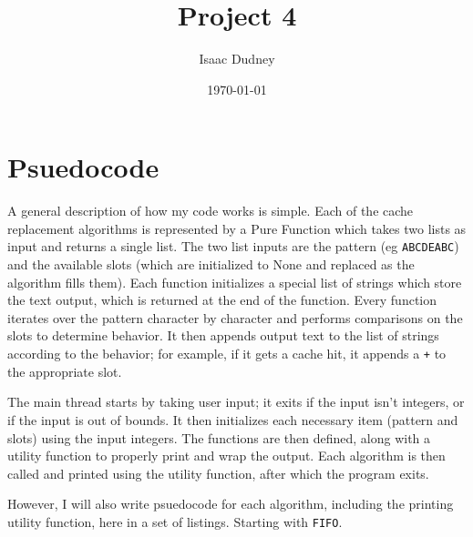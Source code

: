 \documentclass[11pt]{article}
\title{Project 4}
\author{Isaac Dudney}
\date{\today}
\begin{document}
\maketitle

\section{Psuedocode}

A general description of how my code works is simple.
Each of the cache replacement algorithms is represented by a Pure Function which takes two lists as input and returns a single list.
The two list inputs are the pattern (eg \texttt{ABCDEABC}) and the available slots (which are initialized to None and replaced as the algorithm fills them).
Each function initializes a special list of strings which store the text output, which is returned at the end of the function.
Every function iterates over the pattern character by character and performs comparisons on the slots to determine behavior.
It then appends output text to the list of strings according to the behavior; for example, if it gets a cache hit, it appends a \texttt{+} to the appropriate slot.

The main thread starts by taking user input; it exits if the input isn't integers, or if the input is out of bounds.
It then initializes each necessary item (pattern and slots) using the input integers.
The functions are then defined, along with a utility function to properly print and wrap the output.
Each algorithm is then called and printed using the utility function, after which the program exits.

However, I will also write psuedocode for each algorithm, including the printing utility function, here in a set of listings.
Starting with \texttt{FIFO}.

\begin{lstlisting}



\end{lstlisting}
\end{document}
